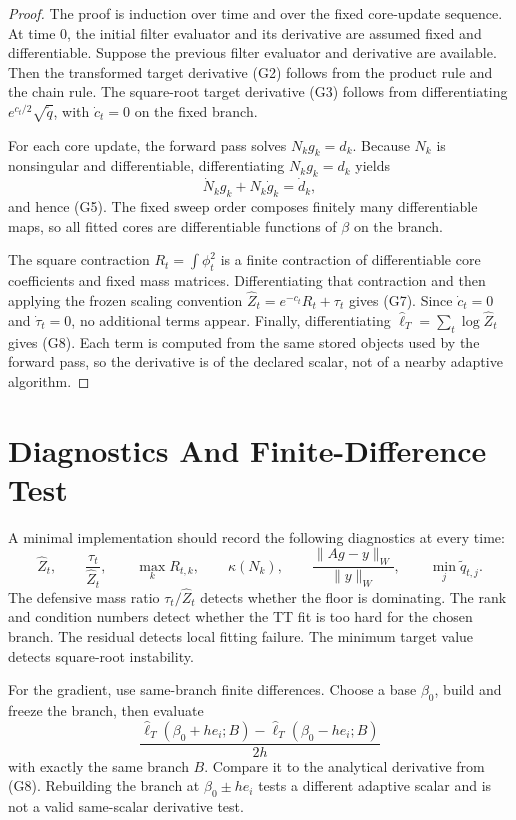 \documentclass[11pt]{article}
\begin{document}
\begin{proof}
The proof is induction over time and over the fixed core-update sequence.  At
time \(0\), the initial filter evaluator and its derivative are assumed fixed
and differentiable.  Suppose the previous filter evaluator and derivative are
available.  Then the transformed target derivative (G2) follows from the
product rule and the chain rule.  The square-root target derivative (G3)
follows from differentiating \(e^{c_t/2}\sqrt{\widetilde q}\), with
\(\dot c_t=0\) on the fixed branch.

For each core update, the forward pass solves \(N_k g_k=d_k\).  Because
\(N_k\) is nonsingular and differentiable, differentiating
\(N_k g_k=d_k\) yields
\[
    \dot N_k g_k+N_k\dot g_k=\dot d_k,
\]
and hence (G5).  The fixed sweep order composes finitely many differentiable
maps, so all fitted cores are differentiable functions of \(\beta\) on the
branch.

The square contraction \(R_t=\int\phi_t^2\) is a finite contraction of
differentiable core coefficients and fixed mass matrices.  Differentiating that
contraction and then applying the frozen scaling convention
\(\widehat Z_t=e^{-c_t}R_t+\tau_t\) gives (G7).  Since
\(\dot c_t=0\) and \(\dot\tau_t=0\), no additional terms appear.  Finally,
differentiating
\(\widehat\ell_T=\sum_t\log\widehat Z_t\) gives (G8).  Each term is computed
from the same stored objects used by the forward pass, so the derivative is of
the declared scalar, not of a nearby adaptive algorithm.
\end{proof}

\section{Diagnostics And Finite-Difference Test}

A minimal implementation should record the following diagnostics at every time:
\[
    \widehat Z_t,\qquad
    \frac{\tau_t}{\widehat Z_t},\qquad
    \max_k R_{t,k},\qquad
    \kappa(N_k),\qquad
    \frac{\|A g-y\|_W}{\|y\|_W},\qquad
    \min_j \widetilde q_{t,j}.
\]
The defensive mass ratio \(\tau_t/\widehat Z_t\) detects whether the floor is
dominating.  The rank and condition numbers detect whether the TT fit is too
hard for the chosen branch.  The residual detects local fitting failure.  The
minimum target value detects square-root instability.

For the gradient, use same-branch finite differences.  Choose a base
\(\beta_0\), build and freeze the branch, then evaluate
\[
    \frac{\widehat\ell_T(\beta_0+h e_i;B)
    -
    \widehat\ell_T(\beta_0-h e_i;B)}
    {2h}
\]
with exactly the same branch \(B\).  Compare it to the analytical derivative
from (G8).  Rebuilding the branch at \(\beta_0\pm h e_i\) tests a different
adaptive scalar and is not a valid same-scalar derivative test.
\end{document}
